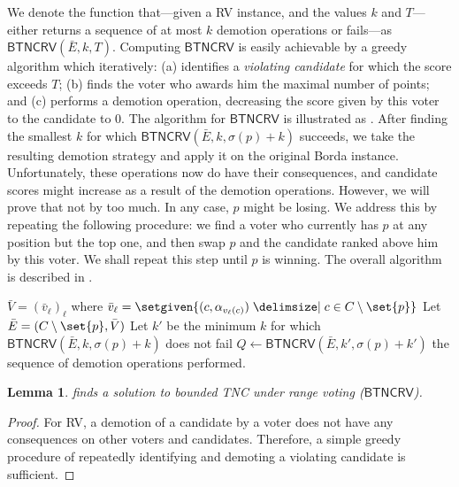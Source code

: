 \documentclass[letterpaper]{article} %
\newtheorem{lemma}{Lemma}
\newcommand{\SB}{\textsc{TNC}}
\newcommand{\CF}{\mathsf{BTNCRV}}
\begin{document}
We denote the function that---given a RV instance, and the values $k$ and $T$---either returns a sequence of at most $k$ demotion operations or fails---as $\CF(\bar{E}, k, T)$.
Computing $\CF{}$ is easily achievable by a greedy algorithm which iteratively: (a)  identifies a \emph{violating candidate} for which the score exceeds $T$; (b) finds the voter who awards him the maximal number of points; and (c) performs a demotion operation, decreasing the score given by this voter to the candidate to $0$. The algorithm for $\CF$ is illustrated as .
After finding the smallest $k$ for which $\CF(\bar{E}, k, \sigma(p) + k)$ succeeds, we take the resulting demotion strategy and apply it on the original Borda instance. Unfortunately, these operations now do have their consequences, and candidate scores might increase as a result of the demotion operations. However, we will prove that not by too much. In any case, $p$ might be losing. We address this by repeating the following procedure: we  find a voter who currently has $p$ at any position but the top one, and then swap $p$ and the candidate ranked above him by this voter. We shall repeat this step until $p$ is winning. The overall algorithm is described in .
\begin{algorithm}[tb]
\caption{\SB{} for Borda}
\label{3k-approxAlg}
$\bar{V}=( \bar{v}_{\ell})_{\ell}$ where $\bar{v}_{\ell} = \setgiven{(c, \alpha_{v_\ell(c)})\given c \in C \setminus \set{p}}$\;
Let $\bar{E} = (C \setminus \set{p}, \bar{V})$\label{line:construct}\;
Let $k'$ be the minimum $k$ for which $\CF(\bar{E}, k, \sigma(p)+k)$ does not fail\label{3k-approxAlg:t-definition}\;
$Q \gets \CF(\bar{E}, k', \sigma(p)+k')$ \label{3k-approxAlg:BeforeBribe}\;
\Return the sequence of demotion operations performed.\;
\end{algorithm}
\begin{lemma}
 finds a solution to bounded \SB{} under range voting ($\CF$).
\end{lemma}
\begin{proof}
For RV, a demotion of a candidate by a voter does not have any consequences on other voters and candidates. Therefore, a simple greedy procedure of repeatedly identifying and demoting a violating candidate is sufficient. \end{proof}
\end{document}
